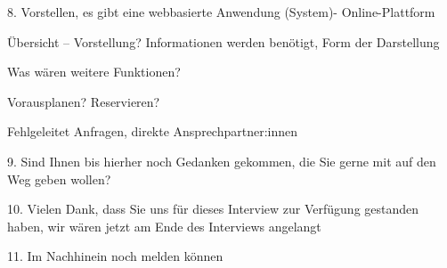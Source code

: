 {\sffamily\color{maincolor}{Abschnitt: Visionen und Ziele}}
\begin{compactenum}
    \item[8.] Vorstellen, es gibt eine webbasierte Anwendung (System)- Online-Plattform
        \begin{compactenum}
            \item Übersicht – Vorstellung?
                  Informationen werden benötigt,
                  Form der Darstellung
            \item Was wären weitere Funktionen?
            \item Vorausplanen? Reservieren?
            \item Fehlgeleitet Anfragen, direkte Ansprechpartner:innen
        \end{compactenum}
    \item[9.] Sind Ihnen bis hierher noch Gedanken gekommen, die Sie gerne mit auf den Weg geben wollen?
    \item[10.] Vielen Dank, dass Sie uns für dieses Interview zur Verfügung gestanden haben, wir wären jetzt am Ende des Interviews angelangt
    \item[11.] Im Nachhinein noch melden können
\end{compactenum}

